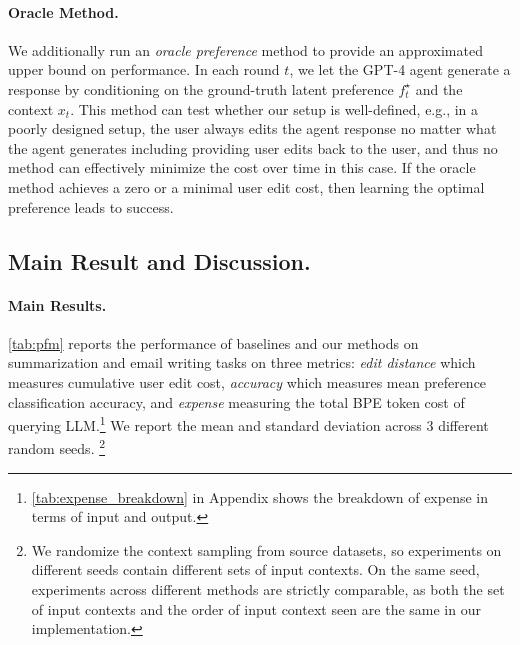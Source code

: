 \paragraph{Oracle Method.} We additionally run an \textit{oracle preference} method to provide an approximated upper bound on performance. In each round $t$, we let the GPT-4 agent generate a response by conditioning on the ground-truth latent preference $f^\star_t$ and the context $x_t$. This method can test whether our setup is well-defined, e.g., in a poorly designed setup, the user always edits the agent response no matter what the agent generates including providing user edits back to the user, and thus no method can effectively minimize the cost over time in this case. If the oracle method achieves a zero or a minimal user edit cost, then learning the optimal preference leads to success.


\subsection{Main Result and Discussion.} 







\paragraph{Main Results.}
\autoref{tab:pfm} reports the performance of baselines and our methods on summarization and email writing tasks on three metrics: \emph{edit distance} which measures cumulative user edit cost, \emph{accuracy} which measures mean preference classification accuracy, and \emph{expense} measuring the total BPE token cost of querying LLM.\footnote{\autoref{tab:expense_breakdown} in Appendix shows the breakdown of expense in terms of input and output.} We report the mean and standard deviation across 3 different random seeds.%
\footnote{We randomize the context sampling from source datasets, so experiments on different seeds contain different sets of input contexts. On the same seed, experiments across different methods are strictly comparable, as both the set of input contexts and the order of input context seen are the same in our implementation.} %

